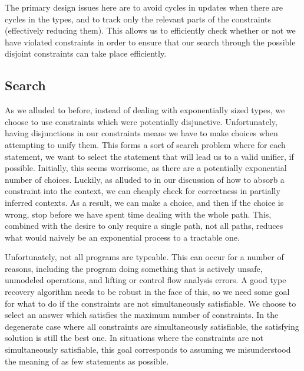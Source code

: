 The primary design issues here are to avoid cycles in updates when there are cycles in the types, and to track only the relevant parts of the constraints (effectively reducing them). This allows us to efficiently check whether or not we have violated constraints in order to ensure that our search through the possible disjoint constraints can take place efficiently.

\subsection{Search}
As we alluded to before, instead of dealing with exponentially sized types, we choose to use constraints which were potentially disjunctive. Unfortunately, having disjunctions in our constraints means we have to make choices when attempting to unify them. This forms a sort of search problem where for each statement, we want to select the statement that will lead us to a valid unifier, if possible. Initially, this seems worrisome, as there are a potentially exponential number of choices. Luckily, as alluded to in our discussion of how to absorb a constraint into the context, we can cheaply check for correctness in partially inferred contexts. As a result, we can make a choice, and then if the choice is wrong, stop before we have spent time dealing with the whole path. This, combined with the desire to only require a single path, not all paths, reduces what would naively be an exponential process to a tractable one.

Unfortunately, not all programs are typeable. This can occur for a number of reasons, including the program doing something that is actively unsafe, unmodeled operations, and lifting or control flow analysis errors. A good type recovery algorithm needs to be robust in the face of this, so we need some goal for what to do if the constraints are not simultaneously satisfiable. We choose to select an answer which satisfies the maximum number of constraints. In the degenerate case where all constraints are simultaneously satisfiable, the satisfying solution is still the best one.
In situations where the constraints are not simultaneously satisfiable, this goal corresponds to assuming we misunderstood the meaning of as few statements as possible.

